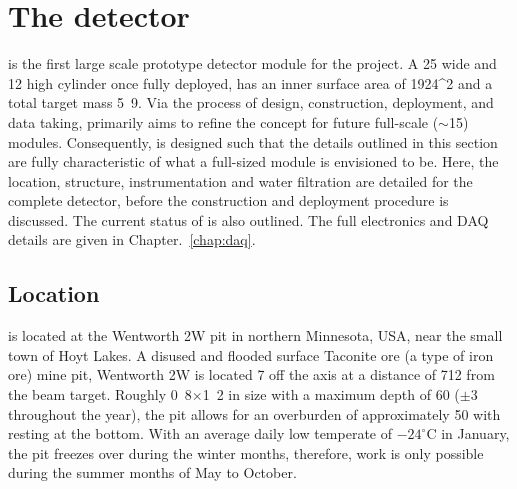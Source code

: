 \section{The \chipsfive detector} %
\label{sec:chips_detector} %

\chipsfive is the first large scale prototype detector module for the \chips project. A
\unit{25}{} wide and \unit{12}{} high cylinder once fully deployed, \chipsfive
has an inner surface area of \unit{1924}{^2} and a total target mass
\unit{5.9}{}. Via the process of design, construction, deployment, and data taking,
\chipsfive primarily aims to refine the \chips concept for future full-scale
($\sim$\unit{15}{}) modules. Consequently, \chipsfive is designed such that the
details outlined in this section are fully characteristic of what a full-sized \chips module is
envisioned to be. Here, the location, structure, instrumentation and water filtration are detailed
for the complete detector, before the construction and deployment procedure is discussed. The
current status of \chipsfive is also outlined. The full electronics and DAQ details are given in
Chapter.~\ref{chap:daq}.

\subsection{Location} %
\label{sec:chips_detector_location} %

\chipsfive is located at the Wentworth 2W pit in northern Minnesota, USA, near the small town of
Hoyt Lakes. A disused and flooded surface Taconite ore (a type of iron ore) mine pit, Wentworth 2W
is located \unit{7}{} off the \numi axis at a distance of \unit{712}{}
from the beam target. Roughly \unit{0.8}{}$\times$\unit{1.2}{} in size with
a maximum depth of \unit{60}{} ($\pm$\unit{3}{} throughout the year), the pit
allows for an overburden of approximately \unit{50}{} with \chipsfive resting at the
bottom. With an average daily low temperate of $-24^{\circ}\mathrm{C}$ in January, the pit freezes
over during the winter months, therefore, work is only possible during the summer months of May to
October.


